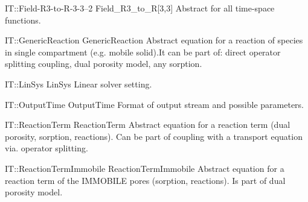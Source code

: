 \begin{AbstractType}
	{IT::Field-R3-to-R-3-3--2}
	{Field{\_}R3{\_}to{\_}R[3,3]}
	{}
	{{{Abstract for all time-space functions.}}}
\end{AbstractType}
\begin{AbstractType}
	{IT::GenericReaction}
	{GenericReaction}
	{}
	{{{Abstract equation for a reaction of species in single compartment (e.g. mobile solid).It can be part of: direct operator splitting coupling, dual porosity model, any sorption.}}}
\end{AbstractType}
\begin{AbstractType}
	{IT::LinSys}
	{LinSys}
	{}
	{{{Linear solver setting.}}}
\end{AbstractType}
\begin{AbstractType}
	{IT::OutputTime}
	{OutputTime}
	{}
	{{{Format of output stream and possible parameters.}}}
\end{AbstractType}
\begin{AbstractType}
	{IT::ReactionTerm}
	{ReactionTerm}
	{}
	{{{Abstract equation for a reaction term (dual porosity, sorption, reactions). Can be part of coupling with a transport equation via. operator splitting.}}}
\end{AbstractType}
\begin{AbstractType}
	{IT::ReactionTermImmobile}
	{ReactionTermImmobile}
	{}
	{{{Abstract equation for a reaction term of the IMMOBILE pores (sorption, reactions). Is part of dual porosity model.}}}
\end{AbstractType}
